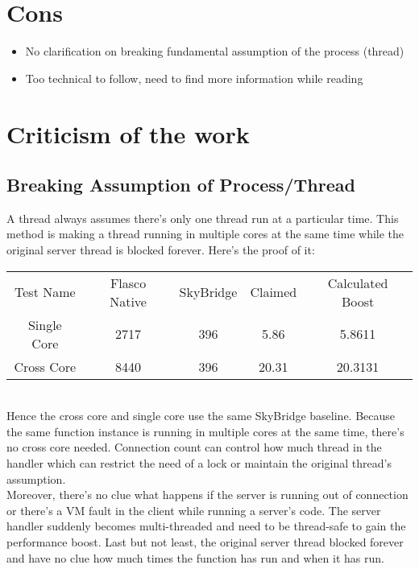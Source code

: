 \documentclass{article}
\begin{document}
\section{Cons}

\begin{itemize}
    \item No clarification on breaking fundamental assumption of the process (thread)
    \item Too technical to follow, need to find more information while reading
\end{itemize}

\section{Criticism of the work}

\subsection{Breaking Assumption of Process/Thread}

A thread always assumes there's only one thread run at a particular time. This method is making a thread running in multiple cores at the same time while the original server thread is blocked forever. Here's the proof of it:

\begin{tabular}{c|c|c|c|c}
    Test Name   & Flasco Native & SkyBridge & Claimed & Calculated Boost\\
    Single Core & 2717          & 396       & 5.86    & 5.8611 \\
    Cross Core  & 8440          & 396       & 20.31   & 20.3131
\end{tabular}\\
Hence the cross core and single core use the same SkyBridge baseline. Because the same function instance is running in multiple cores at the same time, there's no cross core needed. Connection count can control how much thread in the handler which can restrict the need of a lock or maintain the original thread's assumption.\\
Moreover, there's no clue what happens if the server is running out of connection or there's a VM fault in the client while running a server's code. The server handler suddenly becomes multi-threaded and need to be thread-safe to gain the performance boost. Last but not least, the original server thread blocked forever and have no clue how much times the function has run and when it has run. 
\end{document}
